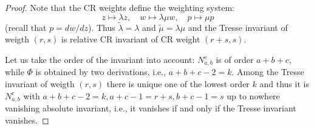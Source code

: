 \documentclass[10pt,a4paper]{amsart}
\begin{document}
\begin{proof}
Note that the CR weights define the weighting system:
$$
z\mapsto \lambda z,\quad w\mapsto \lambda \mu w,\quad p\mapsto \mu p
$$
(recall that $p=dw/dz$).
Thus $ \tilde  \lambda=\lambda$ and $\tilde \mu= \lambda \mu$ and the Tresse invariant of weigth $(r,s)$ is relative CR invariant of CR weight $(r+s,s)$.

Let us take the order of the invariant into account: $N^c_{a,b}$ is of order $a+b+c$, while $\Phi$ is obtained by two derivations, i.e., $a+b+c-2=k$. Among the Tresse invariant of weigth $(r,s)$ there is unique one of the lowest order $k$ and thus it is  $N^c_{a,b}$ with $a+b+c-2=k,a+c-1=r+s,b+c-1=s$ 
up to nowhere vanishing absolute invariant, i.e., it vanishes if and only if the Tresse invariant vanishes.
\end{proof}
\end{document}
